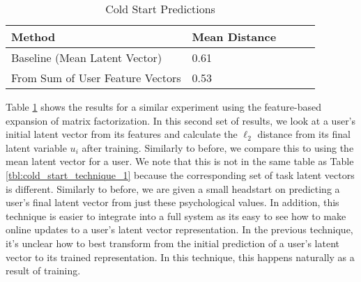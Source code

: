 \begin{table}[t]
\centering
\caption{Cold Start Predictions}
\label{tbl:LightFM}
\begin{tabular}{lllll}
                         \multicolumn{1}{l|}{Method}& Mean Distance \\ \hline
\multicolumn{1}{l|}{Baseline (Mean Latent Vector)} & 0.61 \\
\multicolumn{1}{l|}{From Sum of User Feature Vectors} & 0.53 \\

\end{tabular}
\end{table}

Table \ref{tbl:LightFM} shows the results for a similar experiment using the feature-based expansion of matrix factorization. In this second set of results, we look at a user's initial latent vector from its features and calculate the $\ell_{2}$ distance from its final latent variable $u_{i}$ after training. Similarly to before, we compare this to using the mean latent vector for a user. We note that this is not in the same table as Table \ref{tbl:cold_start_technique_1} because the corresponding set of task latent vectors is different. Similarly to before, we are given a small headstart on predicting a user's final latent vector from just these psychological values. In addition, this technique is easier to integrate into a full system as its easy to see how to make online updates to a user's latent vector representation. In the previous technique, it's unclear how to best transform from the initial prediction of a user's latent vector to its trained representation. In this technique, this happens naturally as a result of training. 